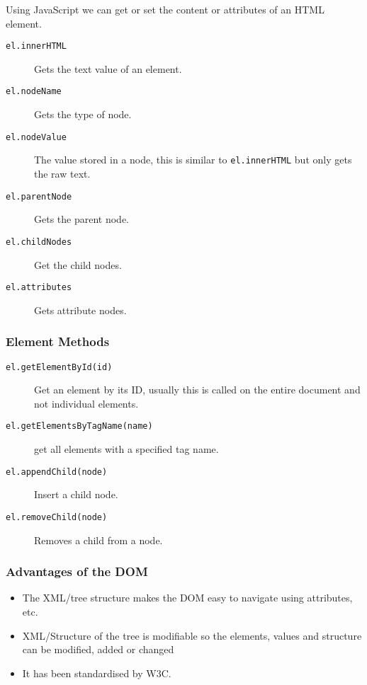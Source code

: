 Using JavaScript we can get or set the content or attributes of an HTML element.
\begin{description}
    \item[\texttt{el.innerHTML}] Gets the text value of an element.
    \item [\texttt{el.nodeName}] Gets the type of node.
    \item[\texttt{el.nodeValue}] The value stored in a node, this is similar to \texttt{el.innerHTML} but only gets the raw text.
    \item[\texttt{el.parentNode}] Gets the parent node.
    \item[\texttt{el.childNodes}] Get the child nodes.
    \item[\texttt{el.attributes}] Gets attribute nodes.
\end{description}

\subsubsection{Element Methods}\label{ssub:element_methods}

\begin{description}
    \item[\texttt{el.getElementById(id)}] Get an element by its ID, usually this is called on the entire document and not individual elements.
    \item[\texttt{el.getElementsByTagName(name)}] get all elements with a specified tag name.
    \item[\texttt{el.appendChild(node)}] Insert a child node.
    \item[\texttt{el.removeChild(node)}] Removes a child from a node.
\end{description}

\subsubsection{Advantages of the DOM}\label{ssub:advantages_of_the_dom}

\begin{itemize}
    \item The XML/tree structure makes the DOM easy to navigate using attributes, etc.
    \item XML/Structure of the tree is modifiable so the elements, values and structure can be modified, added or changed
    \item It has been standardised by W3C.
\end{itemize}

